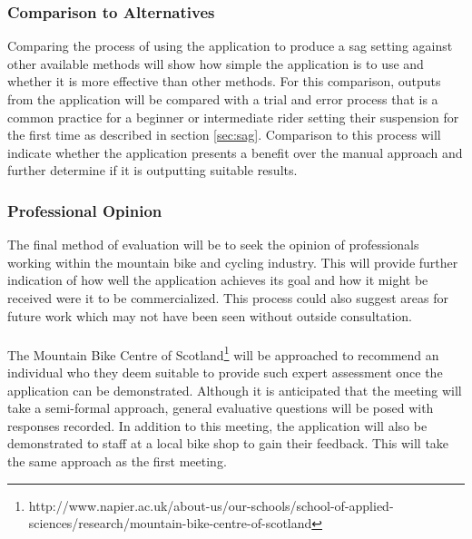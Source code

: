		\subsubsection{Comparison to Alternatives}\label{sec:methodology_manual}
			Comparing the process of using the application to produce a sag setting against other available methods will show how simple the application is to use and whether it is more effective than other methods. For this comparison, outputs from the application will be compared with a trial and error process that is a common practice for a beginner or intermediate rider setting their suspension for the first time as described in section \ref{sec:sag}. Comparison to this process will indicate whether the application presents a benefit over the manual approach and further determine if it is outputting suitable results.
		\subsubsection{Professional Opinion}\label{sec:methodology_professional_opinion}
			The final method of evaluation will be to seek the opinion of professionals working within the mountain bike and cycling industry. This will provide further indication of how well the application achieves its goal and how it might be received were it to be commercialized. This process could also suggest areas for future work which may not have been seen without outside consultation.
			\\\\
			The Mountain Bike Centre of Scotland\footnote{http://www.napier.ac.uk/about-us/our-schools/school-of-applied-sciences/research/mountain-bike-centre-of-scotland} will be approached to recommend an individual who they deem suitable to provide such expert assessment once the application can be demonstrated. Although it is anticipated that the meeting will take a semi-formal approach, general evaluative questions will be posed with responses recorded. In addition to this meeting, the application will also be demonstrated to staff at a local bike shop to gain their feedback. This will take the same approach as the first meeting.
			